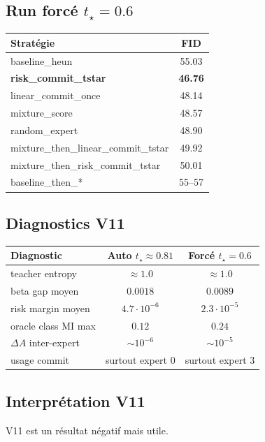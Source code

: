 \documentclass[11pt,a4paper]{article}
\newcommand{\1}{\mathbf{1}}
\begin{document}
\subsection{Run forcé $t_\star=0.6$}

\begin{center}
\begin{tabular}{lc}
\toprule
Stratégie & FID\\
\midrule
baseline\_heun & 55.03\\
\textbf{risk\_commit\_tstar} & \textbf{46.76}\\
linear\_commit\_once & 48.14\\
mixture\_score & 48.57\\
random\_expert & 48.90\\
mixture\_then\_linear\_commit\_tstar & 49.92\\
mixture\_then\_risk\_commit\_tstar & 50.01\\
baseline\_then\_* & 55--57\\
\bottomrule
\end{tabular}
\end{center}

\subsection{Diagnostics V11}

\begin{center}
\begin{tabular}{lcc}
\toprule
Diagnostic & Auto $t_\star\approx0.81$ & Forcé $t_\star=0.6$\\
\midrule
teacher entropy & $\approx1.0$ & $\approx1.0$\\
beta gap moyen & $0.0018$ & $0.0089$\\
risk margin moyen & $4.7\cdot10^{-6}$ & $2.3\cdot10^{-5}$\\
oracle class MI max & $0.12$ & $0.24$\\
$\Delta A$ inter-expert & $\sim10^{-6}$ & $\sim10^{-5}$\\
usage commit & surtout expert $0$ & surtout expert $3$\\
\bottomrule
\end{tabular}
\end{center}

\subsection{Interprétation V11}

V11 est un résultat négatif mais utile.
\end{document}
